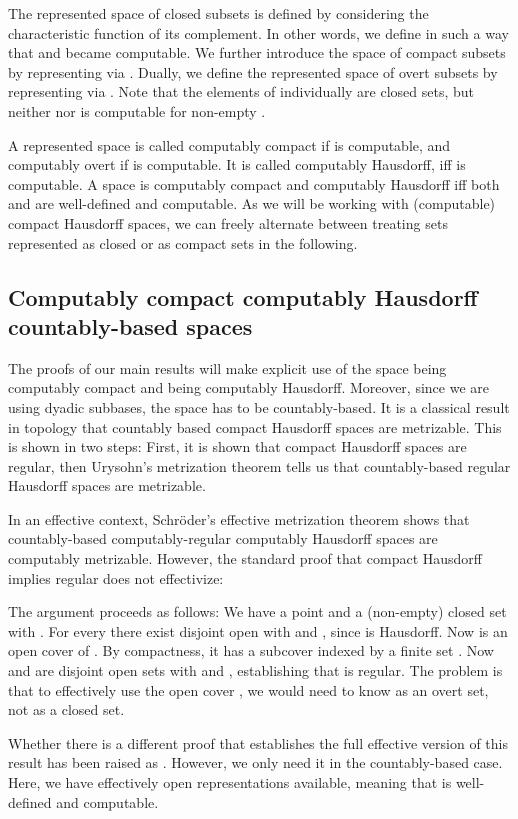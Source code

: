 \documentclass{eptcs-modified}
\begin{document}
The represented space  of closed subsets is defined
by considering the characteristic function of its complement. In other words, we define  in such a way that  and  became computable.
We further introduce the space  of compact subsets by representing  via .
Dually, we define the represented space  of
overt subsets by representing  via . Note that the elements of  individually are closed sets, but neither  nor  is computable for non-empty .

A represented space  is called computably compact if  is computable,
and computably overt if  is computable.
It is called computably Hausdorff, iff  is computable. A space is computably compact and computably Hausdorff iff both  and  are well-defined and computable. As we will be working with (computable) compact Hausdorff spaces, we can freely alternate between treating sets represented as closed or as compact sets in the following.

\subsection{Computably compact computably Hausdorff countably-based spaces}
The proofs of our main results will make explicit use of the space  being computably compact and being computably Hausdorff. Moreover, since we are using dyadic subbases, the space has to be countably-based. It is a classical result in topology that countably based compact Hausdorff spaces are metrizable. This is shown in two steps: First, it is shown that compact Hausdorff spaces are regular, then Urysohn's metrization theorem tells us that countably-based regular Hausdorff spaces are metrizable.

In an effective context, Schr\"oder's effective metrization theorem \cite{grubba3,schroder8} shows that countably-based computably-regular computably Hausdorff spaces are computably metrizable. However, the standard proof that compact Hausdorff implies regular does not effectivize:

The argument proceeds as follows: We have a point  and a (non-empty) closed set  with . For every  there exist disjoint open  with  and , since  is Hausdorff. Now  is an open cover of . By compactness, it has a subcover indexed by a finite set . Now  and  are disjoint open sets with  and , establishing that  is regular. The problem is that to effectively use the open cover , we would need to know  as an overt set, not as a closed set.

Whether there is a different proof that establishes the full effective version of this result has been raised as \cite[Question 9]{oberwolfach-computability}. However, we only need it in the countably-based case. Here, we have effectively open representations available, meaning that  is well-defined and computable.
\end{document}
